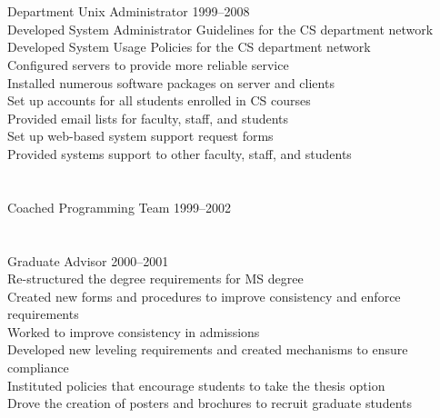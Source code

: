\documentclass[12pt,letter]{resume}
\begin{document}
\vspace*{-1.25\baselineskip}
\section{}{Department Unix Administrator 1999--2008}
{\\
  \hspace*{1em} Developed System Administrator Guidelines for the CS department network\\
  \hspace*{1em} Developed System Usage Policies for the CS department network\\
\hspace*{1em} Configured servers to provide more reliable service\\
\hspace*{1em} Installed numerous software packages on server and clients\\
\hspace*{1em} Set up accounts for all students enrolled in CS courses\\
\hspace*{1em} Provided email lists for faculty, staff, and students\\
\hspace*{1em} Set up web-based system support request forms\\
\hspace*{1em} Provided systems support to other faculty, staff, and students\\
}

\vspace*{-1.25\baselineskip}
\section{}{Coached Programming Team 1999--2002}{}

\vspace*{-1.25\baselineskip}
\section{}{Graduate Advisor 2000--2001}
{\\
\hspace*{1em} Re-structured the degree requirements for MS degree\\
\hspace*{1em} Created new forms and procedures to improve consistency and enforce requirements\\
\hspace*{1em} Worked to improve consistency in admissions\\
\hspace*{1em} Developed new leveling requirements and created mechanisms to ensure compliance\\
\hspace*{1em} Instituted policies that encourage students to take the thesis option\\
\hspace*{1em} Drove the creation of posters and brochures to recruit graduate students\\
}
\end{document}
